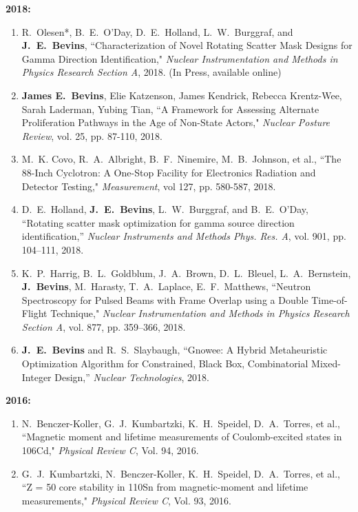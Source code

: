 \textbf{2018:}
\begin{enumerate}
   \item R.\ Olesen*, B.\ E.\ O’Day, D.\ E.\ Holland, L.\ W.\ Burggraf, and \textbf{J.\ E.\ Bevins}, ``Characterization of Novel Rotating Scatter Mask Designs for Gamma Direction Identification," \textit{Nuclear Instrumentation and Methods in Physics Research Section A}, 2018. (In Press, available online)
      
  \item \textbf{James E.\ Bevins}, Elie Katzenson, James Kendrick, Rebecca Krentz-Wee, Sarah Laderman, Yubing Tian, ``A Framework for Assessing Alternate Proliferation Pathways in the Age of Non-State Actors,"  \textit{Nuclear Posture Review}, vol. 25, pp. 87-110, 2018. 
  
  \item M.\ K. Covo, R.\ A.\ Albright, B.\ F.\ Ninemire, M.\ B.\ Johnson, et al., ``The 88-Inch Cyclotron: A One-Stop Facility for Electronics Radiation and Detector Testing," \textit{Measurement}, vol 127, pp. 580-587, 2018. 
  
  \item D.\ E.\ Holland, \textbf{J.\ E.\ Bevins}, L.\ W.\ Burggraf, and B.\ E.\ O’Day, ``Rotating scatter mask optimization for gamma source direction identification,” \textit{Nuclear Instruments and Methods Phys. Res. A}, vol. 901, pp. 104–111, 2018.
  
  \item K.\ P.\ Harrig, B.\ L.\ Goldblum, J.\ A.\ Brown, D.\ L.\ Bleuel, L.\ A.\ Bernstein, \textbf{J.\ Bevins}, M.\ Harasty, T.\ A.\ Laplace, E.\ F.\ Matthews, ``Neutron Spectroscopy for Pulsed Beams with Frame Overlap using a Double Time-of-Flight Technique," \textit{Nuclear Instrumentation and Methods in Physics Research Section A}, vol. 877, pp. 359–366, 2018.

  \item \textbf{J.\ E.\ Bevins} and R.\ S.\ Slaybaugh, ``Gnowee: A Hybrid Metaheuristic Optimization Algorithm for Constrained, Black Box, Combinatorial Mixed-Integer Design,” \textit{Nuclear Technologies}, 2018.
\end{enumerate}

\textbf{2016:}
\begin{enumerate}
  \item N.\ Benczer-Koller, G.\ J.\ Kumbartzki, K.\ H.\ Speidel, D.\ A.\ Torres, et al., ``Magnetic moment and lifetime measurements of Coulomb-excited states in 106Cd," \textit{Physical Review C}, Vol. 94, 2016.
  
  \item G.\ J.\ Kumbartzki, N.\ Benczer-Koller, K.\ H.\ Speidel, D.\ A.\ Torres, et al., ``Z = 50 core stability in 110Sn from magnetic-moment and lifetime measurements," \textit{Physical Review C}, Vol. 93, 2016.
\end{enumerate}

